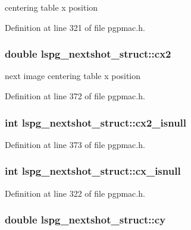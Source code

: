 centering table x position 



Definition at line 321 of file pgpmac.\-h.

\hypertarget{structlspg__nextshot__struct_a10d45763100bc59f9a5f68f1b48db6d3}{
\subsubsection[{cx2}]{\setlength{\rightskip}{0pt plus 5cm}double lspg\-\_\-nextshot\-\_\-struct\-::cx2}}\label{structlspg__nextshot__struct_a10d45763100bc59f9a5f68f1b48db6d3}


next image centering table x position 



Definition at line 372 of file pgpmac.\-h.

\hypertarget{structlspg__nextshot__struct_a3ad947f4efe2cb5c338244b019334749}{
\subsubsection[{cx2\-\_\-isnull}]{\setlength{\rightskip}{0pt plus 5cm}int lspg\-\_\-nextshot\-\_\-struct\-::cx2\-\_\-isnull}}\label{structlspg__nextshot__struct_a3ad947f4efe2cb5c338244b019334749}


Definition at line 373 of file pgpmac.\-h.

\hypertarget{structlspg__nextshot__struct_a779b99533f0ed4e659177afb0b791ad2}{
\subsubsection[{cx\-\_\-isnull}]{\setlength{\rightskip}{0pt plus 5cm}int lspg\-\_\-nextshot\-\_\-struct\-::cx\-\_\-isnull}}\label{structlspg__nextshot__struct_a779b99533f0ed4e659177afb0b791ad2}


Definition at line 322 of file pgpmac.\-h.

\hypertarget{structlspg__nextshot__struct_ab7a7b37a17f06c4e9ebdcdf056946098}{
\subsubsection[{cy}]{\setlength{\rightskip}{0pt plus 5cm}double lspg\-\_\-nextshot\-\_\-struct\-::cy}}\label{structlspg__nextshot__struct_ab7a7b37a17f06c4e9ebdcdf056946098}


